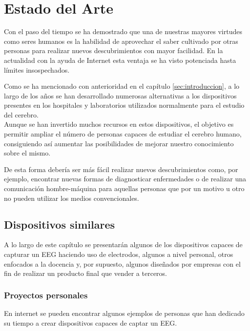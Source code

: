 \chapter{Estado del Arte\label{sec:EstadoDelArte}}

Con el paso del tiempo se ha demostrado que una de nuestras mayores virtudes como seres humanos es la habilidad de aprovechar el saber cultivado por otras personas para realizar nuevos descubrimientos con mayor facilidad. En la actualidad con la ayuda de Internet esta ventaja se ha visto potenciada hasta límites insospechados.

Como se ha mencionado con anterioridad en el capítulo \ref{sec:introduccion}, a lo largo de los años se han desarrollado numerosas alternativas a los dispositivos presentes en los hospitales y laboratorios utilizados normalmente para el estudio del cerebro. 
\\Aunque se han invertido muchos recursos en estos dispositivos, el objetivo es permitir ampliar el número de personas capaces de estudiar el cerebro humano, consiguiendo  así aumentar las posibilidades de mejorar nuestro conocimiento sobre el mismo.

De esta forma debería ser más fácil realizar nuevos descubrimientos como, por ejemplo, encontrar nuevas formas de diagnosticar enfermedades o de realizar una comunicación hombre-máquina para aquellas personas que por un motivo u otro no pueden utilizar los medios convencionales.

\clearpage

\section{Dispositivos similares\label{sec:Disp_similares}}

A lo largo de este capítulo se presentarán algunos de los dispositivos capaces de capturar un EEG haciendo uso de electrodos, algunos a nivel personal, otros enfocados a la docencia y, por supuesto, algunos diseñados por empresas con el fin de realizar un producto final que vender a terceros.

\subsection{Proyectos personales\label{sec:Pro_personales}}

En internet se pueden encontrar algunos ejemplos de personas que han dedicado su tiempo a crear dispositivos capaces de captar un EEG. 

